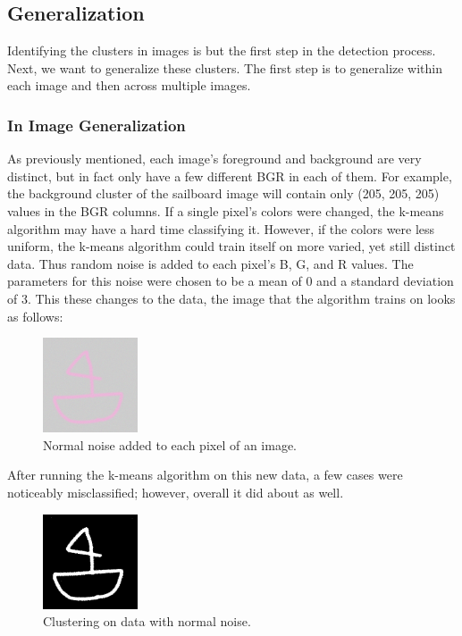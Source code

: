 \documentclass[12pt]{article}
\begin{document}
\subsection{Generalization}
Identifying the clusters in images is but the first step in the detection process. Next, we want to generalize these clusters. The first step is to generalize within each image and then across multiple images.

\subsubsection{In Image Generalization}
As previously mentioned, each image's foreground and background are very distinct, but in fact only have a few different BGR in each of them. For example, the background cluster of the sailboard image will contain only (205, 205, 205) values in the BGR columns. If a single pixel's colors were changed, the k-means algorithm may have a hard time classifying it. However, if the colors were less uniform, the k-means algorithm could train itself on more varied, yet still distinct data. Thus random noise is added to each pixel's B, G, and R values. The parameters for this noise were chosen to be a mean of 0 and a standard deviation of 3. This these changes to the data, the image that the algorithm trains on looks as follows:

\begin{figure}[H]
\centering
\includegraphics[width=0.25\textwidth]{img/noise_data2.png}
\caption{Normal noise added to each pixel of an image.}
\label{fig:noise1}
\end{figure}

After running the k-means algorithm on this new data, a few cases were noticeably misclassified; however, overall it did about as well.

\begin{figure}[H]
	\centering
	\includegraphics[width=0.25\textwidth]{img/noise_data2_bwnoise.png}
	\caption{Clustering on data with normal noise.}
	\label{fig:noise2}
\end{figure}
\end{document}
